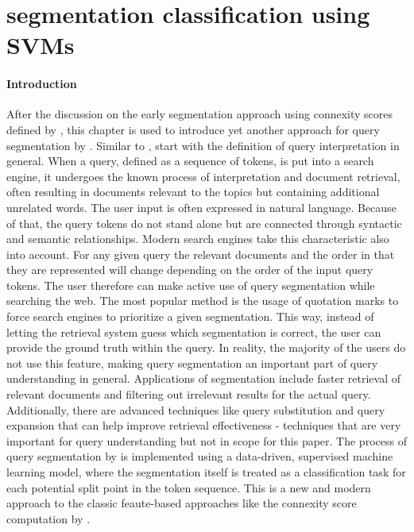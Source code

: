 \section{segmentation classification using SVMs} \label{approach2}





\paragraph*{Introduction}
After the discussion on the early segmentation approach using connexity scores defined by \citeauthor{Risvik:2003}, this chapter is used to introduce yet another approach for query segmentation by \citeauthor{Bergsma:2007}. Similar to \citeauthor{Risvik:2003}, \citeauthor{Bergsma:2007} start with the definition of query interpretation in general. When a query, defined as a sequence of tokens, is put into a search engine, it undergoes the known process of interpretation and document retrieval, often resulting in documents relevant to the topics but containing additional unrelated words. The user input is often expressed in natural language. Because of that, the query tokens do not stand alone but are connected through syntactic and semantic relationships. Modern search engines take this characteristic also into account. For any given query the relevant documents and the order in that they are represented will change depending on the order of the input query tokens. The user therefore can make active use of query segmentation while searching the web. The most popular method is the usage of quotation marks to force search engines to prioritize a given segmentation. This way, instead of letting the retrieval system guess which segmentation is correct, the user can provide the ground truth within the query. In reality, the majority of the users do not use this feature, making query segmentation an important part of query understanding in general. Applications of segmentation include faster retrieval of relevant documents and filtering out irrelevant results for the actual query. Additionally, there are advanced techniques like query substitution and query expansion that can help improve retrieval effectiveness - techniques that are very important for query understanding but not in scope for this paper. The process of query segmentation by \citeauthor{Bergsma:2007} is implemented using a data-driven, supervised machine learning model, where the segmentation itself is treated as a classification task for each potential split point in the token sequence. This is a new and modern approach to the classic feaute-based approaches like the connexity score computation by \citet{Risvik:2003}.

